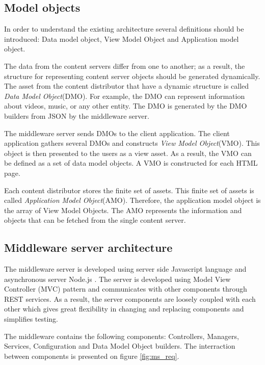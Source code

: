 \subsection{Model objects}

In order to understand the existing architecture several definitions should be introduced: Data model object, View Model Object and Application model object.

The data from the content servers differ from one to another; as a result, the structure for representing content server objects should be generated dynamically. The asset from the content distributor that have a dynamic structure is called \textit{Data Model Object}(DMO). For example, the DMO can represent information about videos, music, or any other entity. The DMO is generated by the DMO builders from JSON by the middleware server.

The middleware server sends DMOs to the client application. The client application gathers several DMOs and constructs \textit{View Model Object}(VMO). This object is then presented to the users as a view asset. As a result, the VMO can be defined as a set of data model objects. A VMO is constructed for each HTML page. 

Each content distributor stores the finite set of assets. This finite set of assets is called \textit{Application Model Object}(AMO). Therefore, the application model object is the array of View Model Objects. The AMO represents the information and objects that can be fetched from the single content server.


\subsection{Middleware server architecture}

The middleware server is developed using server side Javascript language and asynchronous server Node.js \cite{Nodejs}. The server is developed using Model View Controller (MVC) pattern and communicates with other components through REST services. As a result, the server components are loosely coupled with each other which gives great flexibility in changing and replacing components and simplifies testing. 

The middleware contains the following components: Controllers, Managers, Services, Configuration and Data Model Object builders. The interraction between components is presented on figure \ref{fig:ms_req}.

